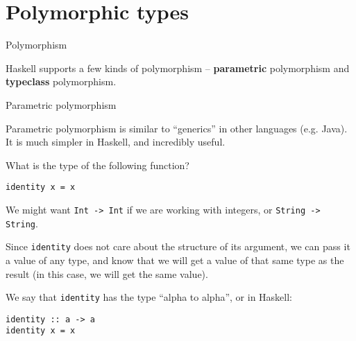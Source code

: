 
\section{Polymorphic types}

%
\begin{frame}[fragile]{Polymorphism}

Haskell supports a few kinds of polymorphism -- \textbf{parametric} polymorphism
and \textbf{typeclass} polymorphism.

\end{frame}

%
\begin{frame}[fragile]{Parametric polymorphism}

Parametric polymorphism is similar to ``generics'' in other languages (e.g.
Java). It is much simpler in Haskell, and incredibly useful.

What is the type of the following function?

\begin{verbatim}
identity x = x
\end{verbatim}

We might want \texttt{Int -> Int} if we are working with integers, or
\texttt{String -> String}.

Since \texttt{identity} does not care about the structure of its argument, we
can pass it a value of any type, and know that we will get a value of that same
type as the result (in this case, we will get the same value).

We say that \texttt{identity} has the type ``alpha to alpha'', or in Haskell:

\begin{verbatim}
identity :: a -> a
identity x = x
\end{verbatim}

\end{frame}


